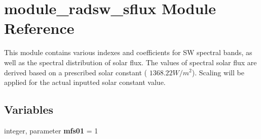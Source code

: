 \hypertarget{namespacemodule__radsw__sflux}{}\section{module\+\_\+radsw\+\_\+sflux Module Reference}
\label{namespacemodule__radsw__sflux}


This module contains various indexes and coefficients for SW spectral bands, as well as the spectral distribution of solar flux. The values of spectral solar flux are derived based on a prescribed solar constant ( $1368.22 W/m^2$). Scaling will be applied for the actual inputted solar constant value.  


\subsection*{Variables}
\begin{DoxyCompactItemize}
\item 
\mbox{\label{namespacemodule__radsw__sflux_aba08e6f9d4dccd130e87300e6fd0ed58}} 
integer, parameter {\bfseries mfs01} = 1
\end{DoxyCompactItemize}
